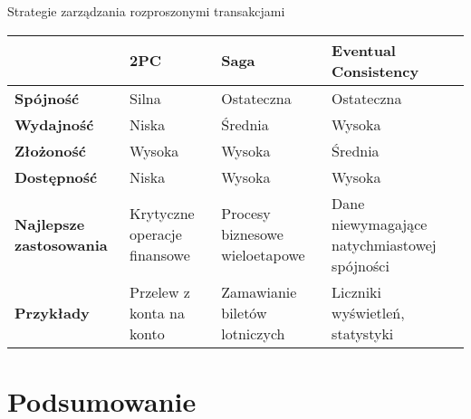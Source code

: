 \documentclass[aspectratio=169,xcolor=table]{beamer}
\begin{document}
\begin{frame}{Strategie zarządzania rozproszonymi transakcjami}
  \begin{table}
    \footnotesize
    \begin{tabular}{>{\raggedright\arraybackslash}p{2.8cm}|>{\raggedright\arraybackslash}p{2.8cm}|>{\raggedright\arraybackslash}p{2.8cm}|>{\raggedright\arraybackslash}p{2.8cm}}
      \toprule
      & \textbf{2PC} & \textbf{Saga} & \textbf{Eventual Consistency} \\
      \midrule
      \textbf{Spójność} & Silna & Ostateczna & Ostateczna \\
      \midrule
      \textbf{Wydajność} & Niska & Średnia & Wysoka \\
      \midrule
      \textbf{Złożoność} & Wysoka & Wysoka & Średnia \\
      \midrule
      \textbf{Dostępność} & Niska & Wysoka & Wysoka \\
      \midrule
      \textbf{Najlepsze zastosowania} & Krytyczne operacje finansowe & Procesy biznesowe wieloetapowe & Dane niewymagające natychmiastowej spójności \\
      \midrule
      \textbf{Przykłady} & Przelew z konta na konto & Zamawianie biletów lotniczych & Liczniki wyświetleń, statystyki \\
      \bottomrule
    \end{tabular}
  \end{table}
\end{frame}

\section{Podsumowanie}
\end{document}
